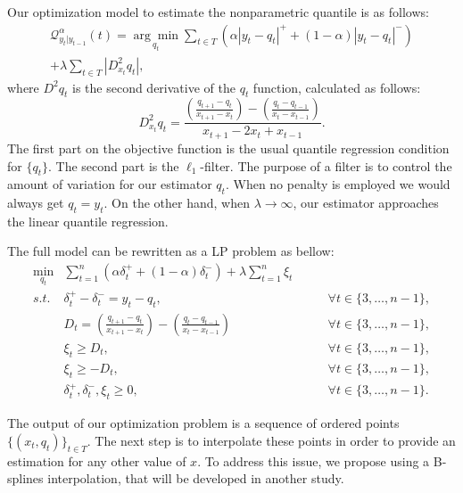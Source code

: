 Our optimization model to estimate the nonparametric quantile is as follows:
\begin{equation}
\begin{split}
\mathcal{Q}_{y_t|y_{t-1}}^\alpha(t) =\underset{q_{t}}{\arg\min}\sum_{t\in T} \left( \alpha |y_{t}-q_{t}|^{+} + (1-\alpha)|y_{t}-q_{t}|^{-}\right) \\ +\lambda  \sum_{t\in T}|D_{x_t}^{2}q_{t}|,
\end{split}
\end{equation}
where $D^2 q_t$ is the second derivative of the $q_t$ function, calculated as follows:
\begin{equation*}
D_{x_{t}}^{2}q_{t}=\frac{\left(\frac{q_{t+1}-q_{t}}{x_{t+1}-x_{t}}\right)-\left(\frac{q_{t}-q_{t-1}}{x_{t}-x_{t-1}}\right)}{x_{t+1}-2x_{t} + x_{t-1}}.
\end{equation*}
The first part on the objective function is the usual quantile regression condition for $\{q_t\}$. The second part is the $\ell_1$-filter. The purpose of a filter is to control the amount of variation for our estimator $q_t$. When no penalty is employed we would always get $q_t = y_t$. On the other hand, when $\lambda \rightarrow \infty$, our estimator approaches the linear quantile regression. 

The full model can be rewritten as a LP problem as bellow:
\begin{eqnarray}
\min_{q_{t}} & \sum_{t=1}^{n}\left(\alpha\delta_{t}^{+}+(1-\alpha)\delta_{t}^{-}\right)+\lambda\sum_{t=1}^{n}\xi_{t}\\
s.t. & \delta_{t}^{+}-\delta_{t}^{-}=y_{t}-q_{t}, & \qquad\forall t\in\{3,\dots,n-1\},\\
 & D_{t}=\left(\frac{q_{t+1}-q_{t}}{x_{t+1}-x_{t}}\right)-\left(\frac{q_{t}-q_{t-1}}{x_{t}-x_{t-1}}\right) & \qquad\forall t\in\{3,\dots,n-1\},\\
 & \xi_{t}\geq D_{t}, & \qquad\forall t\in\{3,\dots,n-1\},\\
 & \xi_{t}\geq-D_{t}, & \qquad\forall t\in\{3,\dots,n-1\},\\
 & \delta_{t}^{+},\delta_{t}^{-},\xi_{t}\geq0, & \qquad\forall t\in\{3,\dots,n-1\}.
\end{eqnarray}

The output of our optimization problem is a sequence of ordered points $\{(x_t, q_t)\}_{t \in T}$. The next step is to interpolate these points in order to provide an estimation for any other value of $x$. To address this issue, we propose using a B-splines interpolation, that will be developed in another study.

